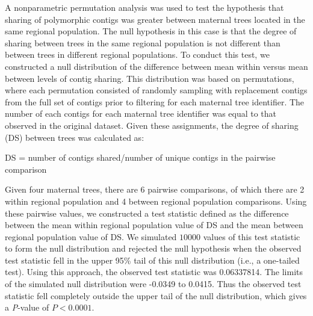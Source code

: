 \documentclass[smallextended]{svjour3}
\begin{document}
A nonparametric permutation analysis was used to test the hypothesis that
sharing of polymorphic contigs was greater between maternal trees located in the
same regional population. The null hypothesis in this case is that the degree of
sharing between trees in the same regional population is not different than
between trees in different regional populations. To conduct this test, we
constructed a null distribution of the difference between mean within versus
mean between levels of contig sharing. This distribution was based on
permutations, where each permutation consisted of randomly sampling with
replacement contigs from the full set of contigs prior to filtering for each
maternal tree identifier. The number of each contigs for each maternal tree
identifier was equal to that observed in the original dataset. Given these
assignments, the degree of sharing (DS) between trees was calculated as:

DS = number of contigs shared/number of unique contigs in the pairwise
comparison

Given four maternal trees, there are 6 pairwise comparisons, of which there are
2 within regional population and 4 between regional population
comparisons. Using these pairwise values, we constructed a test statistic
defined as the difference between the mean within regional population value of
DS and the mean between regional population value of DS. We simulated $10000$
values of this test statistic to form the null distribution and rejected the
null hypothesis when the observed test statistic fell in the upper 95\% tail of
this null distribution (i.e., a one-tailed test). Using this approach, the
observed test statistic was 0.06337814. The limits of the simulated null
distribution were -0.0349 to 0.0415. Thus the observed test statistic fell
completely outside the upper tail of the null distribution, which gives a
\textit{P}-value of $P < 0.0001$.
\end{document}
